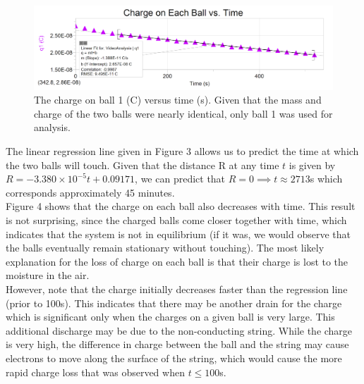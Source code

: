 \documentclass[oneside,12pt]{amsart}
\begin{document}
\begin{figure}[h]
	\includegraphics[width=\linewidth,scale=0.01]{ChargevTime.png}
	\caption{The charge on ball 1 (C) versus time (s). Given that the mass and charge of the two balls were nearly identical, only ball 1 was used for analysis.}
	\label{Charge}
	
\end{figure}

\indent The linear regression line given in Figure 3 allows us to predict the time at which the two balls will touch. Given that the distance R at any time $t$ is given by $R = -3.380\times10^{-5}t + 0.09171$, we can predict that $R=0 \implies t \approx 2713$s which corresponds approximately 45 minutes.\\

\indent Figure 4 shows that the charge on each ball also decreases with time. This result is not surprising, since the charged balls come closer together with time, which indicates that the system is not in equilibrium (if it was, we would observe that the balls eventually remain stationary without touching). The most likely explanation for the loss of charge on each ball is that their charge is lost to the moisture in the air.\\

\indent However, note that the charge initially decreases faster than the regression line (prior to 100s). This indicates that there may be another drain for the charge which is significant only when the charges on a given ball is very large. This additional discharge may be due to the non-conducting string. While the charge is very high, the difference in charge between the ball and the string may cause electrons to move along the surface of the string, which would cause the more rapid charge loss that was observed when $t\le 100$s. 
	
\end{document}
